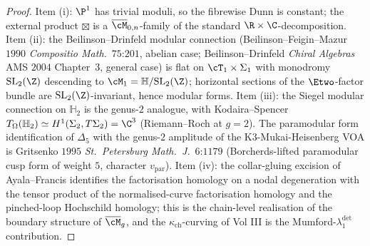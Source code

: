 \begin{proof}
Item (i): $\P^1$ has trivial moduli, so the fibrewise Dunn is constant; the external product $\boxtimes$ is a $\overline{\cM}_{0, n}$-family of the standard $\R \times \C$-decomposition. Item (ii): the Beilinson--Drinfeld modular connection (Beilinson--Feigin--Mazur $1990$ \emph{Compositio Math.}~$75$:$201$, abelian case; Beilinson--Drinfeld \emph{Chiral Algebras} AMS $2004$ Chapter~$3$, general case) is flat on $\cT_1 \times \Sigma_1$ with monodromy $\mathrm{SL}_2(\Z)$ descending to $\cM_1 = \mathbb H / \mathrm{SL}_2(\Z)$; horizontal sections of the $\Etwo$-factor bundle are $\mathrm{SL}_2(\Z)$-invariant, hence modular forms. Item (iii): the Siegel modular connection on $\mathbb H_2$ is the genus-$2$ analogue, with Kodaira--Spencer $T_\Omega(\mathbb H_2) \simeq H^1(\Sigma_2, T \Sigma_2) = \C^3$ (Riemann--Roch at $g = 2$). The paramodular form identification of $\Delta_5$ with the genus-$2$ amplitude of the K3-Mukai-Heisenberg VOA is Gritsenko $1995$ \emph{St.~Petersburg Math.~J.}~$6$:$1179$ (Borcherds-lifted paramodular cusp form of weight $5$, character $v_{\mathrm{par}}$). Item (iv): the collar-gluing excision of Ayala--Francis identifies the factorisation homology on a nodal degeneration with the tensor product of the normalised-curve factorisation homology and the pinched-loop Hochschild homology; this is the chain-level realisation of the boundary structure of $\overline{\cM}_g$, and the $\kappa_{\mathrm{ch}}$-curving of Vol III is the Mumford-$\lambda_1^{\det}$ contribution.
\end{proof}


